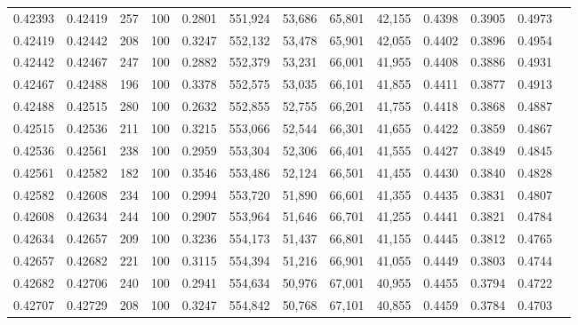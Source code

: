 \begin{tabular}{rrrrrrrrrrrrr}
0.42393 & 0.42419 &    257 & 100 &                                     0.2801 & 551,924 &  53,686 &  65,801 &  42,155 & 0.4398 & 0.3905 & 0.4973 \\
0.42419 & 0.42442 &    208 & 100 &                                     0.3247 & 552,132 &  53,478 &  65,901 &  42,055 & 0.4402 & 0.3896 & 0.4954 \\
0.42442 & 0.42467 &    247 & 100 &                                     0.2882 & 552,379 &  53,231 &  66,001 &  41,955 & 0.4408 & 0.3886 & 0.4931 \\
0.42467 & 0.42488 &    196 & 100 &                                     0.3378 & 552,575 &  53,035 &  66,101 &  41,855 & 0.4411 & 0.3877 & 0.4913 \\
0.42488 & 0.42515 &    280 & 100 &                                     0.2632 & 552,855 &  52,755 &  66,201 &  41,755 & 0.4418 & 0.3868 & 0.4887 \\
0.42515 & 0.42536 &    211 & 100 &                                     0.3215 & 553,066 &  52,544 &  66,301 &  41,655 & 0.4422 & 0.3859 & 0.4867 \\
0.42536 & 0.42561 &    238 & 100 &                                     0.2959 & 553,304 &  52,306 &  66,401 &  41,555 & 0.4427 & 0.3849 & 0.4845 \\
0.42561 & 0.42582 &    182 & 100 &                                     0.3546 & 553,486 &  52,124 &  66,501 &  41,455 & 0.4430 & 0.3840 & 0.4828 \\
0.42582 & 0.42608 &    234 & 100 &                                     0.2994 & 553,720 &  51,890 &  66,601 &  41,355 & 0.4435 & 0.3831 & 0.4807 \\
0.42608 & 0.42634 &    244 & 100 &                                     0.2907 & 553,964 &  51,646 &  66,701 &  41,255 & 0.4441 & 0.3821 & 0.4784 \\
0.42634 & 0.42657 &    209 & 100 &                                     0.3236 & 554,173 &  51,437 &  66,801 &  41,155 & 0.4445 & 0.3812 & 0.4765 \\
0.42657 & 0.42682 &    221 & 100 &                                     0.3115 & 554,394 &  51,216 &  66,901 &  41,055 & 0.4449 & 0.3803 & 0.4744 \\
0.42682 & 0.42706 &    240 & 100 &                                     0.2941 & 554,634 &  50,976 &  67,001 &  40,955 & 0.4455 & 0.3794 & 0.4722 \\
0.42707 & 0.42729 &    208 & 100 &                                     0.3247 & 554,842 &  50,768 &  67,101 &  40,855 & 0.4459 & 0.3784 & 0.4703 \\

\end{tabular}
